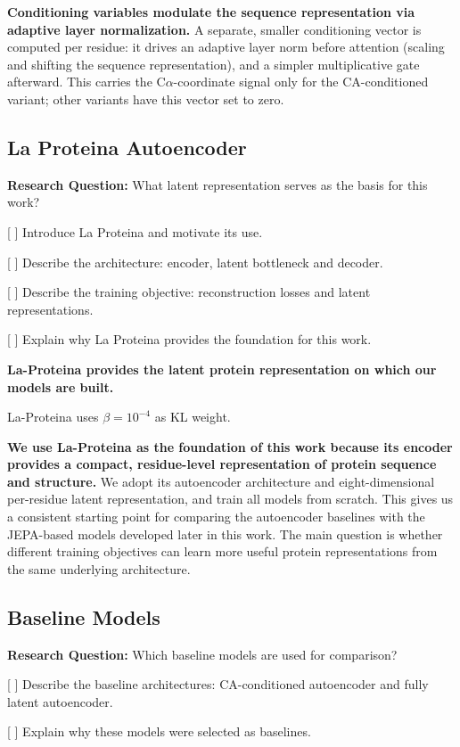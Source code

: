 \textbf{Conditioning variables modulate the sequence representation via adaptive layer
normalization.} A separate, smaller conditioning vector is computed per residue: it drives an
adaptive layer norm before attention (scaling and shifting the sequence representation),
and a simpler multiplicative gate afterward. This carries the C$\alpha$-coordinate signal
only for the CA-conditioned variant; other variants have this vector set to zero.


\subsection{La Proteina Autoencoder}
\textbf{Research Question:} What latent representation serves as the basis for this work?

[ ] Introduce La Proteina and motivate its use.

[ ] Describe the architecture: encoder, latent bottleneck and decoder.

[ ] Describe the training objective: reconstruction losses and latent representations.

[ ] Explain why La Proteina provides the foundation for this work.

\textbf{La-Proteina provides the latent protein representation on which our models are built.}

La-Proteina uses $\beta=10^{-4}$ as KL weight.

\textbf{We use La-Proteina as the foundation of this work because its encoder provides a compact, residue-level representation of protein sequence and structure.}
We adopt its autoencoder architecture and eight-dimensional per-residue latent representation, and train all models from scratch. This gives us a consistent starting point for comparing the autoencoder baselines with the JEPA-based models developed later in this work. The main question is whether different training objectives can learn more useful protein representations from the same underlying architecture.


\subsection{Baseline Models}
\textbf{Research Question:} Which baseline models are used for comparison?

[ ] Describe the baseline architectures: CA-conditioned autoencoder and fully latent autoencoder.

[ ] Explain why these models were selected as baselines.

